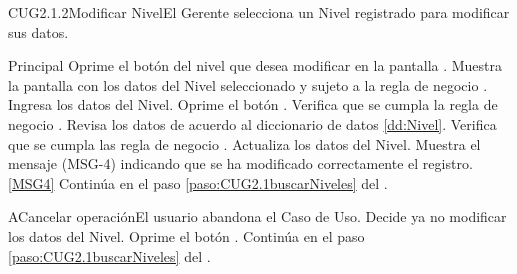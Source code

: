 	\begin{UseCase}{CUG2.1.2}{Modificar Nivel}{El Gerente selecciona un Nivel registrado para modificar sus datos.}
	\end{UseCase}

	\begin{UCtrayectoria}{Principal}			
			\UCpaso[\UCactor] Oprime el botón  del nivel que desea modificar en la pantalla .
			\UCpaso Muestra la pantalla  con los datos del Nivel seleccionado y sujeto a la regla de negocio .
                        \UCpaso [\UCactor] Ingresa los datos del Nivel.\label{paso:CUG2.1.2ingresaDatosNivel}
			\UCpaso [\UCactor] Oprime el botón .
			\UCpaso Verifica que se cumpla la regla de negocio .  
			\UCpaso Revisa los datos de acuerdo al diccionario de datos \ref{dd:Nivel}. 
			\UCpaso Verifica que se cumpla las regla de negocio  .  
			\UCpaso Actualiza los datos del Nivel.
			\UCpaso Muestra el mensaje (MSG-4) indicando que se ha modificado correctamente el registro.\ref{MSG4}
			\UCpaso Continúa en el paso \ref{paso:CUG2.1buscarNiveles} del .
	\end{UCtrayectoria}

		\begin{UCtrayectoriaA}{A}{Cancelar operación}{El usuario abandona el Caso de Uso.}
			\UCpaso[\UCactor] Decide ya no modificar los datos del Nivel.
			\UCpaso[\UCactor] Oprime el botón .
			\UCpaso Continúa en el paso \ref{paso:CUG2.1buscarNiveles} del .
		\end{UCtrayectoriaA}

